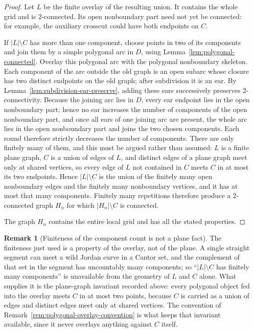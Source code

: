 \documentclass[11pt]{article}
\theoremstyle{mainplain}
\theoremstyle{mainroman}
\theoremstyle{definition}
\newtheorem{remark}[theorem]{Remark}
\numberwithin{equation}{section}
\begin{document}
\begin{proof}
Let \(L\) be the finite overlay of the resulting union. It contains the whole grid and is 2-connected. Its open nonboundary part need not yet be connected: for example, the auxiliary crosscut could have both endpoints on \(C\).

If \(|L|\setminus C\) has more than one component, choose points in two of its components and join them by a simple polygonal arc in \(D\), using Lemma~\ref{lem:polygonal-connected}. Overlay this polygonal arc with the polygonal nonboundary skeleton. Each component of the arc outside the old graph is an open subarc whose closure has two distinct endpoints on the old graph; after subdivision it is an ear. By Lemma~\ref{lem:subdivision-ear-preserve}, adding these ears successively preserves 2-connectivity. Because the joining arc lies in \(D\), every ear endpoint lies in the open nonboundary part; hence no ear increases the number of components of the open nonboundary part, and once all ears of one joining arc are present, the whole arc lies in the open nonboundary part and joins the two chosen components. Each round therefore strictly decreases the number of components. There are only finitely many of them, and this must be argued rather than assumed: \(L\) is a finite plane graph, \(C\) is a union of edges of \(L\), and distinct edges of a plane graph meet only at shared vertices, so every edge of \(L\) not contained in \(C\) meets \(C\) in at most its two endpoints. Hence \(|L|\setminus C\) is the union of the finitely many open nonboundary edges and the finitely many nonboundary vertices, and it has at most that many components. Finitely many repetitions therefore produce a 2-connected graph \(H_n\) for which \(|H_n|\setminus C\) is connected.

The graph \(H_n\) contains the entire local grid and has all the stated properties. \end{proof}

\begin{remark}[Finiteness of the component count is not a plane fact]\label{rem:grid-attachment-finiteness}
The finiteness just used is a property of the overlay, not of the
plane. A single straight segment can meet a wild Jordan curve in a
Cantor set, and the complement of that set in the segment has
uncountably many components; so ``\(|L|\setminus C\) has finitely many
components'' is unavailable from the geometry of \(L\) and \(C\)
alone. What supplies it is the plane-graph invariant recorded above:
every polygonal object fed into the overlay meets \(C\) in at most two
points, because \(C\) is carried as a union of edges and distinct
edges meet only at shared vertices. The convention of
Remark~\ref{rem:polygonal-overlay-convention} is what keeps that
invariant available, since it never overlays anything against \(C\)
itself.
\end{remark}
\end{document}
